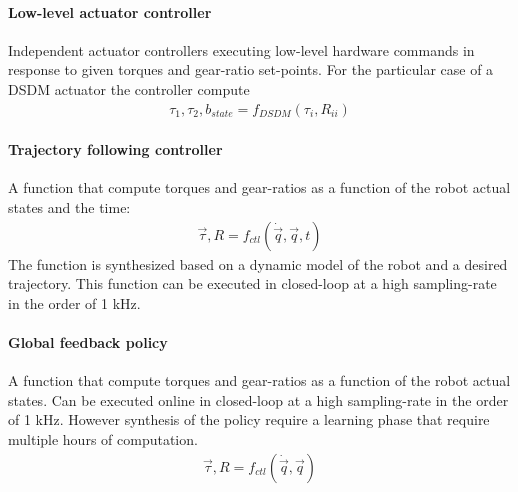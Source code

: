 \paragraph{Low-level actuator controller} Independent actuator controllers executing low-level hardware commands in response to given torques and gear-ratio set-points. For the particular case of a DSDM actuator the controller compute 
%
\begin{align}
  \tau_1 , \tau_2 , b_{state} = f_{DSDM}(\tau_i, R_{ii})
	\label{eq:low-level-dsdm}
\end{align}
%

\paragraph{Trajectory following controller} A function that compute torques and gear-ratios as a function of the robot actual states and the time:
%
\begin{align}
  \vec{\tau}, R = f_{ctl}(\dot{\vec{q}}, \vec{q} , t)
	\label{eq:trajctl}
\end{align}
%
 The function is synthesized based on a dynamic model of the robot and a desired trajectory. This function can be executed in closed-loop at a high sampling-rate in the order of 1 kHz.

\paragraph{Global feedback policy} A function that compute torques and gear-ratios as a function of the robot actual states. Can be executed online in closed-loop at a high sampling-rate in the order of 1 kHz. However synthesis of the policy require a learning phase that require multiple hours of computation. 
%
\begin{align}
  \vec{\tau}, R = f_{ctl}(\dot{\vec{q}}, \vec{q})
	\label{eq:globctl}
\end{align}
%




